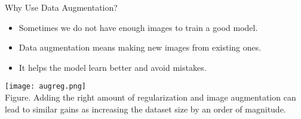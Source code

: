 \begin{refsection}
\begin{frame}{Why Use Data Augmentation?}
  \begin{minipage}{0.48\linewidth}
    \begin{itemize}
      \item Sometimes we do not have enough images to train a good model.
      \item Data augmentation means making new images from existing ones.
      \item It helps the model learn better and avoid mistakes.
    \end{itemize}
  \end{minipage}%
  \hfill
  \begin{minipage}{0.48\linewidth}
    \centering
    \texttt{[image: augreg.png]}
    \scriptsize \\
    Figure. Adding the right amount of regularization and image augmentation can lead to similar gains as increasing the dataset size by an order of magnitude.~\parencite{steinerHowTrainYour2022}
  \end{minipage}
  \bottomleftrefs
\end{frame}
\end{refsection}

